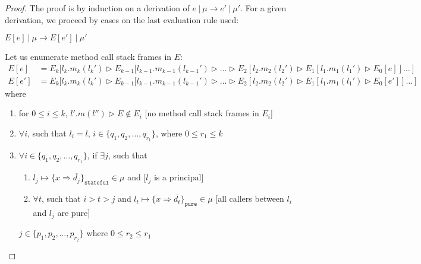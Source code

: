 \documentclass{llncs}
\newcommand{\keywadj}[1]{\mathtt{#1}}
\newcommand{\intuition}[1]{#1}
\begin{document}
\begin{proof} The proof is by induction on a derivation of $e~|~\mu \longrightarrow e'~|~\mu'$. For a given derivation, we proceed by cases on the last evaluation rule used:\\

\sloppy

\noindent{} $E[e]~|~\mu \longrightarrow E[e']~|~\mu'$

Let us enumerate method call stack frames in $E$:
\begin{align*}
E[e] &= E_k[l_k.m_k(l_k') \rhd E_{k-1}[l_{k-1}.m_{k-1}(l_{k-1}') \rhd \dots \rhd E_2[l_2.m_2(l_2') \rhd E_1[l_1.m_1(l_1') \rhd E_0[e]] \dots ]\\
E[e'] &= E_k[l_k.m_k(l_k') \rhd E_{k-1}[l_{k-1}.m_{k-1}(l_{k-1}') \rhd \dots \rhd E_2[l_2.m_2(l_2') \rhd E_1[l_1.m_1(l_1') \rhd E_0[e']] \dots ]
\end{align*}
where
\begin{enumerate}
\item for $0 \leq i \leq k$, $l'.m(l'') \rhd E \not\in E_i$ \intuition{\hspace{150pt} [no method call stack frames in $E_i$]}
\item $\forall i$, such that $l_i = l$, $i \in \{ q_1, q_2, \dots, q_{r_1} \}$, where $0 \leq r_1 \leq k$ \intuition{}
\item $\forall i \in \{ q_1, q_2, \dots, q_{r_1} \}$, if $\exists j$, such that
\begin{enumerate}
\item $l_j \mapsto \{ x \Rightarrow \overline{d_j} \}_{\keywadj{stateful}} \in \mu$ and \intuition{\hspace{230pt} [$l_j$ is a principal]}
\item $\forall t$, such that $i > t > j$ and $l_t \mapsto \{ x \Rightarrow \overline{d_t} \}_{\keywadj{pure}} \in \mu$ \intuition{\hspace{60pt} [all callers between $l_i$ and $l_j$ are pure]}
\end{enumerate}
$j \in \{ p_1, p_2, \dots, p_{r_2}\}$ where $0 \leq r_2 \leq r_1$
\intuition{}

\end{enumerate}
\end{proof}
\end{document}
